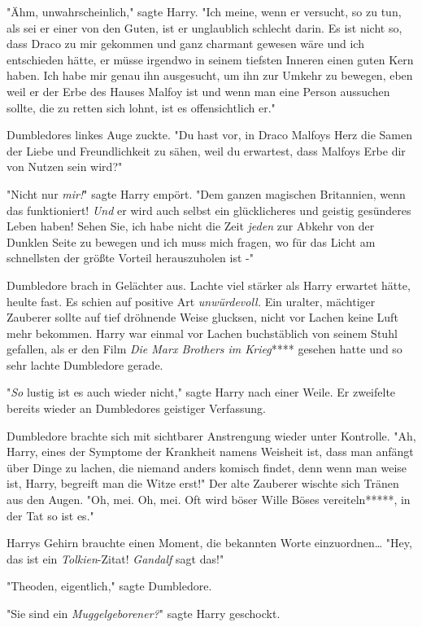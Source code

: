 {"Ähm, unwahrscheinlich," sagte Harry. "Ich meine, wenn er versucht, so zu tun, als sei er einer von den Guten, ist er unglaublich schlecht darin. Es ist nicht so, dass Draco zu mir gekommen und ganz charmant gewesen wäre und ich entschieden hätte, er müsse irgendwo in seinem tiefsten Inneren einen guten Kern haben. Ich habe mir genau ihn ausgesucht, um ihn zur Umkehr zu bewegen, eben weil er der Erbe des Hauses Malfoy ist und wenn man eine Person aussuchen sollte, die zu retten sich lohnt, ist es offensichtlich er."

Dumbledores linkes Auge zuckte. "Du hast vor, in Draco Malfoys Herz die Samen der Liebe und Freundlichkeit zu sähen, weil du erwartest, dass Malfoys Erbe dir von Nutzen sein wird?"

"Nicht nur \emph{mir!}" sagte Harry empört. "Dem ganzen magischen Britannien, wenn das funktioniert! \emph{Und} er wird auch selbst ein glücklicheres und geistig gesünderes Leben haben! Sehen Sie, ich habe nicht die Zeit \emph{jeden} zur Abkehr von der Dunklen Seite zu bewegen und ich muss mich fragen, wo für das Licht am schnellsten der größte Vorteil herauszuholen ist -"

Dumbledore brach in Gelächter aus. Lachte viel stärker als Harry erwartet hätte, heulte fast. Es schien auf positive Art \emph{unwürdevoll.} Ein uralter, mächtiger Zauberer sollte auf tief dröhnende Weise glucksen, nicht vor Lachen keine Luft mehr bekommen. Harry war einmal vor Lachen buchstäblich von seinem Stuhl gefallen, als er den Film \emph{Die Marx Brothers im Krieg}**** gesehen hatte und so sehr lachte Dumbledore gerade.

"\emph{So} lustig ist es auch wieder nicht," sagte Harry nach einer Weile. Er zweifelte bereits wieder an Dumbledores geistiger Verfassung.

Dumbledore brachte sich mit sichtbarer Anstrengung wieder unter Kontrolle. "Ah, Harry, eines der Symptome der Krankheit namens Weisheit ist, dass man anfängt über Dinge zu lachen, die niemand anders komisch findet, denn wenn man weise ist, Harry, begreift man die Witze erst!" Der alte Zauberer wischte sich Tränen aus den Augen. "Oh, mei. Oh, mei. Oft wird böser Wille Böses vereiteln*****, in der Tat so ist es."

Harrys Gehirn brauchte einen Moment, die bekannten Worte einzuordnen… "Hey, das ist ein \emph{Tolkien}-Zitat! \emph{Gandalf} sagt das!"

"Theoden, eigentlich," sagte Dumbledore.

"Sie sind ein \emph{Muggelgeborener?}" sagte Harry geschockt.

}
